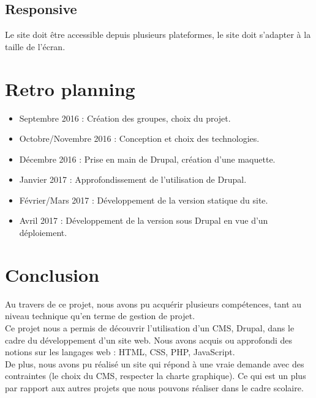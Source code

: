 \documentclass[11pt]{report}
\begin{document}
\subsection*{Responsive}
Le site doit être accessible depuis plusieurs plateformes, le site doit s'adapter
à la taille de l'écran.


\section{Retro planning}

\begin{itemize}
	\item Septembre 2016 : Création des groupes, choix du projet.
	\item Octobre/Novembre 2016 : Conception et choix des technologies.
	\item Décembre 2016 : Prise en main de Drupal, création d'une maquette.
	\item Janvier 2017 : Approfondissement de l'utilisation de Drupal.
	\item Février/Mars 2017 : Développement de la version statique du site.
	\item Avril 2017 : Développement de la version sous Drupal en vue d'un déploiement.
\end{itemize}


\section{Conclusion}

Au travers de ce projet, nous avons pu acquérir plusieurs compétences, tant au
niveau technique qu'en terme de gestion de projet. \\
Ce projet nous a permis de découvrir l'utilisation d'un CMS, Drupal, dans le cadre du
développement d'un site web. Nous avons acquis ou approfondi des notions sur les
langages web : HTML, CSS, PHP, JavaScript. \\
De plus, nous avons pu réalisé un site qui répond à une vraie demande avec des
contraintes (le choix du CMS, respecter la charte graphique). Ce qui est un
plus par rapport aux autres projets que nous pouvons réaliser dans le cadre scolaire. \\
\end{document}
